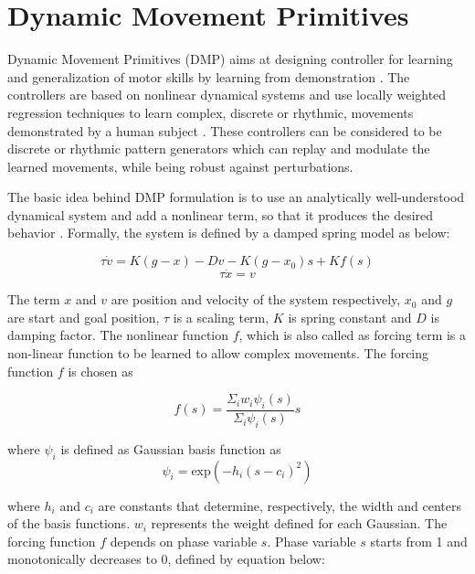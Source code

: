 \documentclass[sigconf]{acmart}
\begin{document}
\section{Dynamic Movement Primitives}
\label{sec:dmp}
Dynamic Movement Primitives (DMP) aims at designing controller for learning and generalization of motor skills by learning from demonstration \cite{ijspeert2003learning}. The controllers are based on nonlinear dynamical systems and use locally weighted regression techniques to learn complex, discrete or rhythmic, movements demonstrated by a human subject \cite{ijspeert2002movement}. These controllers can be considered to be discrete or rhythmic pattern generators which can replay and modulate the learned movements, while being robust against perturbations.

The basic idea behind DMP formulation is to use an analytically well-understood dynamical system and add a nonlinear term, so that it produces the desired behavior \cite{ijspeert2013dynamical}. Formally, the system is defined by a damped spring model as below:

\begin{equation}
	\tau	 \dot{v} = K (g - x) -D v - K (g - x_0) s + K f(s)
\end{equation}
\begin{equation}
	\tau	 \dot{x} = v
\end{equation}

The term $x$ and $v$ are position and velocity of the system respectively, $x_0$ and $g$ are start and goal position, $\tau$ is a scaling term, $K$ is spring constant and $D$ is damping factor. The nonlinear function $f$, which is also called as forcing term is a non-linear function to be learned to allow complex movements. The forcing function $f$ is chosen as

\begin{equation}
	f(s) = \frac{\Sigma_{i} w_i \psi_i(s)}{\Sigma_{i} \psi_i(s)} s
	\label{eq:forcing_func}
\end{equation}

where $\psi_i$ is defined as Gaussian basis function as
\begin{equation}
	\psi_i = \textrm{exp}\left( -h_i \left( s - c_i\right)^2 \right)
\end{equation}

where $h_i$ and $c_i$ are constants that determine, respectively, the width and centers of the basis functions. $w_i$ represents the weight defined for each Gaussian. The forcing function $f$ depends on phase variable $s$. Phase variable $s$ starts from 1 and monotonically decreases to 0, defined by equation below:
\end{document}
